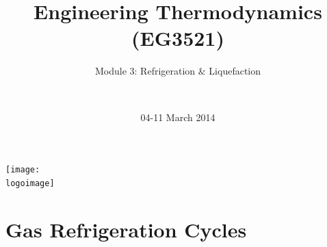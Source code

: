 \documentclass[10pt,compress]{beamer}
\institute{School of Engineering}
\title{Engineering Thermodynamics (EG3521)}
\subtitle{Module 3: Refrigeration $\&$ Liquefaction}
\date[04-11/03/2014]{04-11 March 2014}
\author[\shortname]{%
  \fullname\\\ttfamily{\emailaddress}
}
\newcommand{\logoimage}{../FigBanner/UoAHorizBanner}
\begin{document}
\begin{frame}
  \titlepage
  \vfill%
  \begin{center}
    \texttt{[image: \\logoimage]}
  \end{center}
\end{frame}






\section{Gas Refrigeration Cycles}
\end{document}
